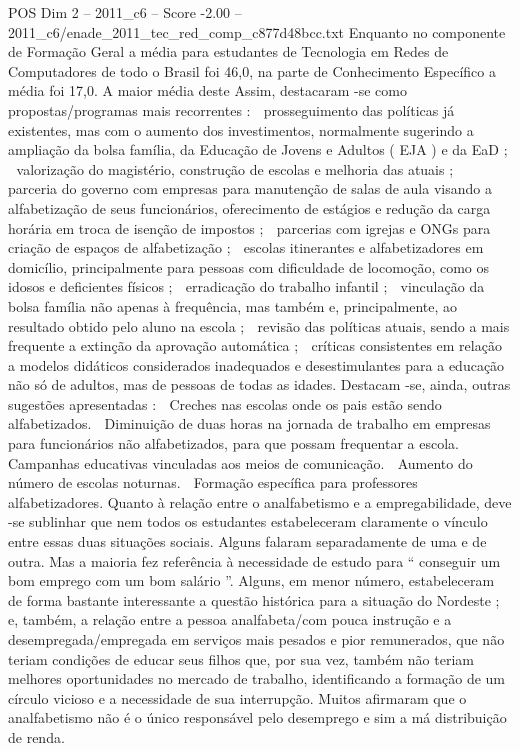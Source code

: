 \begin{textsample}{POS Dim 2 – 2011\_c6 – Score -2.00 – 2011\_c6/enade\_2011\_tec\_red\_comp\_c877d48bcc.txt}
Enquanto no componente de Formação Geral a média para estudantes de Tecnologia em Redes de Computadores de todo o Brasil foi 46,0, na parte de Conhecimento Específico a média foi 17,0.
A maior média deste Assim, destacaram -se como propostas/programas mais recorrentes :  prosseguimento das políticas já existentes, mas com o aumento dos investimentos, normalmente sugerindo a ampliação da bolsa família, da Educação de Jovens e Adultos ( EJA ) e da EaD ;  valorização do magistério, construção de escolas e melhoria das atuais ;  parceria do governo com empresas para manutenção de salas de aula visando a alfabetização de seus funcionários, oferecimento de estágios e redução da carga horária em troca de isenção de impostos ;  parcerias com igrejas e ONGs para criação de espaços de alfabetização ;  escolas itinerantes e alfabetizadores em domicílio, principalmente para pessoas com dificuldade de locomoção, como os idosos e deficientes físicos ;  erradicação do trabalho infantil ;  vinculação da bolsa família não apenas à frequência, mas também e, principalmente, ao resultado obtido pelo aluno na escola ;  revisão das políticas atuais, sendo a mais frequente a extinção da aprovação automática ;  críticas consistentes em relação a modelos didáticos considerados inadequados e desestimulantes para a educação não só de adultos, mas de pessoas de todas as idades.
Destacam -se, ainda, outras sugestões apresentadas :  Creches nas escolas onde os pais estão sendo alfabetizados.  Diminuição de duas horas na jornada de trabalho em empresas para funcionários não alfabetizados, para que possam frequentar a escola.  Campanhas educativas vinculadas aos meios de comunicação.  Aumento do número de escolas noturnas.  Formação específica para professores alfabetizadores.
Quanto à relação entre o analfabetismo e a empregabilidade, deve -se sublinhar que nem todos os estudantes estabeleceram claramente o vínculo entre essas duas situações sociais.
Alguns falaram separadamente de uma e de outra.
Mas a maioria fez referência à necessidade de estudo para “ conseguir um bom emprego com um bom salário ”.
Alguns, em menor número, estabeleceram de forma bastante interessante a questão histórica para a situação do Nordeste ; e, também, a relação entre a pessoa analfabeta/com pouca instrução e a desempregada/empregada em serviços mais pesados e pior remunerados, que não teriam condições de educar seus filhos que, por sua vez, também não teriam melhores oportunidades no mercado de trabalho, identificando a formação de um círculo vicioso e a necessidade de sua interrupção.
Muitos afirmaram que o analfabetismo não é o único responsável pelo desemprego e sim a má distribuição de renda.

\end{textsample}
